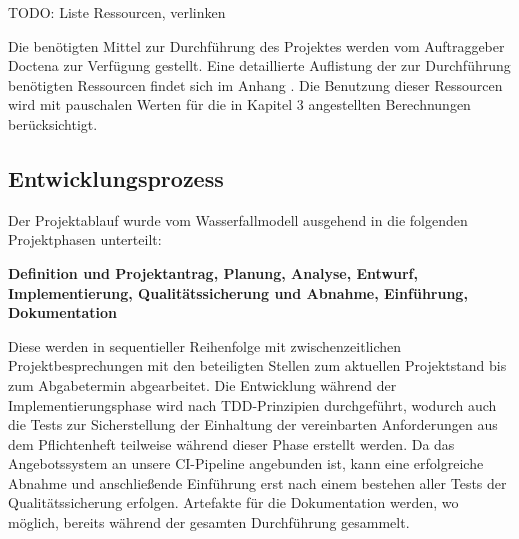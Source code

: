 TODO: Liste Ressourcen, verlinken

Die benötigten Mittel zur Durchführung des Projektes werden vom Auftraggeber Doctena zur Verfügung gestellt. Eine detaillierte Auflistung der zur Durchführung benötigten Ressourcen findet sich im Anhang . Die Benutzung dieser Ressourcen wird mit pauschalen Werten für die in Kapitel 3 angestellten Berechnungen berücksichtigt.

\subsection{Entwicklungsprozess}
\label{sec:Entwicklungsprozess}
Der Projektablauf wurde vom Wasserfallmodell ausgehend in die folgenden Projektphasen unterteilt:

\textbf{Definition und Projektantrag, Planung, Analyse, Entwurf, Implementierung, Qualitätssicherung und Abnahme, Einführung, Dokumentation}

Diese werden in sequentieller Reihenfolge mit zwischenzeitlichen Projektbesprechungen mit den beteiligten Stellen zum aktuellen Projektstand bis zum Abgabetermin abgearbeitet. Die Entwicklung während der Implementierungsphase wird nach TDD-Prinzipien durchgeführt, wodurch auch die Tests zur Sicherstellung der Einhaltung der vereinbarten Anforderungen aus dem Pflichtenheft teilweise während dieser Phase erstellt werden. Da das Angebotssystem an unsere CI-Pipeline angebunden ist, kann eine erfolgreiche Abnahme und anschließende Einführung erst nach einem bestehen aller Tests der Qualitätssicherung erfolgen. Artefakte für die Dokumentation werden, wo möglich, bereits während der gesamten Durchführung gesammelt.
